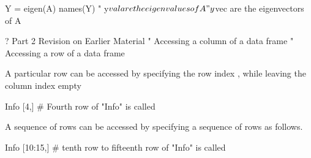 Y = eigen(A)
names(Y)
"	y$val are the eigenvalues of A
"	y$vec are the eigenvectors of A

?
Part 2 Revision on Earlier Material
"	Accessing a column of a data frame
"	Accessing a row of a data frame

A particular row can be accessed by specifying the row index , while leaving the column index empty

Info [4,]			# Fourth row of "Info" is called

A sequence of rows can be accessed by specifying a sequence of rows as follows.

Info [10:15,]		# tenth row to fifteenth row of "Info" is called
